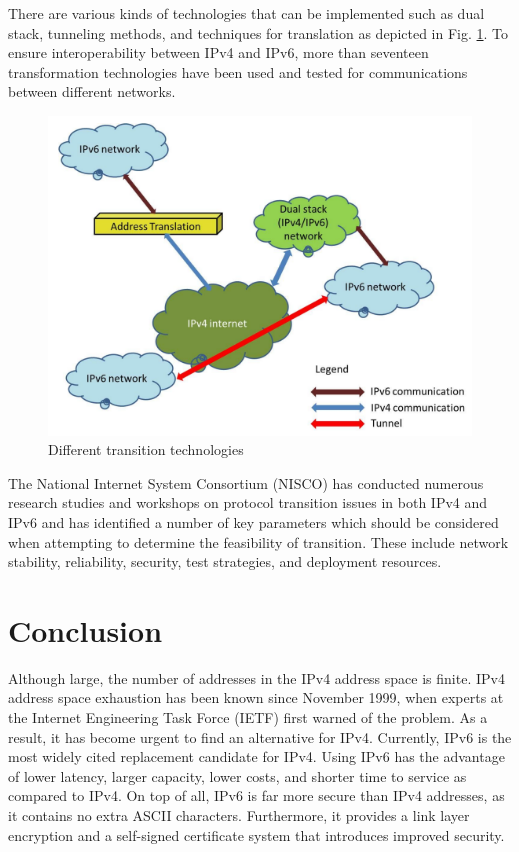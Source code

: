\documentclass[conference,12pt]{IEEEtran}
\begin{document}
There are various kinds of technologies that can be implemented such as dual stack, tunneling methods, and techniques for translation as depicted in Fig. \ref{ipv6-transition}. To ensure interoperability between IPv4 and IPv6, more than seventeen transformation technologies have been used and tested for communications between different networks.
\begin{figure}[htbp]
\centerline{\includegraphics[scale=0.6]{resources/ipv6-transition.png}}
\caption{Different transition technologies}
\label{ipv6-transition}
\end{figure}
The National Internet System Consortium (NISCO) has conducted numerous research studies and workshops on protocol transition issues in both IPv4 and IPv6 and has identified a number of key parameters which should be considered when attempting to determine the feasibility of transition. These include network stability, reliability, security, test strategies, and deployment resources.

\section{Conclusion}
Although large, the number of addresses in the IPv4 address space is finite. IPv4 address space exhaustion  has been known since November 1999, when experts at the Internet Engineering Task Force (IETF) first warned of the problem. As a result, it has become urgent to find an alternative for IPv4. Currently, IPv6 is the most widely cited replacement candidate for IPv4. Using IPv6 has the advantage of lower latency, larger capacity, lower costs, and shorter time to service as compared to IPv4. On top of all, IPv6 is far more secure than IPv4 addresses, as it contains no extra ASCII characters. Furthermore, it provides a link layer encryption and a self-signed certificate system that introduces improved security.
\end{document}
